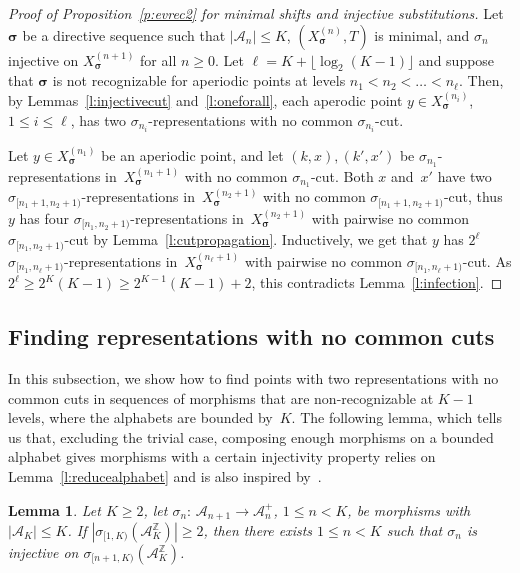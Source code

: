 \documentclass{amsart}
\newtheorem{lemma}{Lemma}[section]
\theoremstyle{definition}
\theoremstyle{remark}
\numberwithin{equation}{section}
\begin{document}
\begin{proof}[Proof of Proposition~\ref{p:evrec2} for minimal shifts and injective substitutions]
Let $\boldsymbol{\sigma}$ be a directive sequence 
such that $|\mathcal{A}_n| \le K$, $(X_{\boldsymbol{\sigma}}^{(n)},T)$ is minimal, and $\sigma_n$ injective on $X_{\boldsymbol{\sigma}}^{(n+1)}$ for all $n\ge0$. 
Let $\ell = K + \lfloor \log_2(K-1) \rfloor $ and suppose that $\boldsymbol{\sigma}$ is not recognizable for aperiodic points at levels $n_1 < n_2 < \dots < n_\ell$.
Then, by Lemmas~\ref{l:injectivecut} and~\ref{l:oneforall}, each aperodic point $y \in X_{\boldsymbol{\sigma}}^{(n_i)}$, $1 \le i \le \ell$, has two $\sigma_{n_i}$-representations with no common $\sigma_{n_i}$-cut. 

Let $y \in X_{\boldsymbol{\sigma}}^{(n_1)}$ be an aperiodic point, and let $(k,x), (k',x')$ be $\sigma_{n_1}$-representations in~$X_{\boldsymbol{\sigma}}^{(n_1+1)}$ with no common $\sigma_{n_1}$-cut.
Both $x$ and~$x'$ have two $\sigma_{[n_1+1,n_2+1)}$-representations in~$X_{\boldsymbol{\sigma}}^{(n_2+1)}$ with no common $\sigma_{[n_1+1,n_2+1)}$-cut, thus $y$ has four $\sigma_{[n_1,n_2+1)}$-representations in~$X_{\boldsymbol{\sigma}}^{(n_2+1)}$ with pairwise no common $\sigma_{[n_1,n_2+1)}$-cut by Lemma~\ref{l:cutpropagation}.
Inductively, we get that $y$ has $2^\ell$ $\sigma_{[n_1,n_\ell+1)}$-representations in~$X_{\boldsymbol{\sigma}}^{(n_\ell+1)}$ with pairwise no common $\sigma_{[n_1,n_\ell+1)}$-cut.
As $2^\ell \ge 2^K (K-1) \ge 2^{K-1} (K-1)+2$, this contradicts Lemma~\ref{l:infection}.
\end{proof}

\subsection{Finding representations with no common cuts} \label{sec:finding-an-injective}
In this subsection, we show how to find points with two representations with no common cuts in sequences of morphisms that are non-recognizable at $K-1$ levels, where the alphabets are bounded by~$K$.
The following lemma, which tells us that, excluding the trivial case, composing enough morphisms on a bounded alphabet gives morphisms with a certain injectivity property relies on Lemma~\ref{l:reducealphabet} and is also inspired by~\cite{Down:2008}. 

\begin{lemma} \label{lem:common_cuts}
Let $K \ge 2$, let $\sigma_n:\, \mathcal{A}_{n+1} \to \mathcal{A}_n^+$, $1 \le n < K$, be morphisms with $|\mathcal{A}_K| \le K$.
If $|\sigma_{[1,K)}(\mathcal{A}_K^\mathbb{Z})| \ge 2$, then there exists $1 \le n < K$ such that $\sigma_n$ is injective on $\sigma_{[n+1,K)}(\mathcal{A}_K^\mathbb{Z})$. 
\end{lemma}
\end{document}
